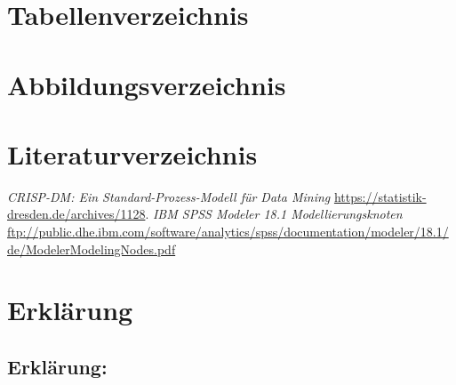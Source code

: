 \documentclass[a4paper,12pt]{article}
\begin{document}
\section{Tabellenverzeichnis}
\listoftables 


\newpage
\section{Abbildungsverzeichnis}
\listoffigures
{}
\newpage

\newpage
\section{Literaturverzeichnis}
\thispagestyle{plain}
\begin{thebibliography}{DiplRS}
 {\it CRISP-DM: Ein Standard-Prozess-Modell für Data Mining} \url{ https://statistik-dresden.de/archives/1128}.
 {\it IBM SPSS Modeler 18.1 Modellierungsknoten} 
\url{ftp://public.dhe.ibm.com/software/analytics/spss/documentation/modeler/18.1/de/ModelerModelingNodes.pdf}
\end{thebibliography}

\newpage
\section{Erklärung}
\begin{titlepage}
\section*{Erklärung:}

\vfill
\end{titlepage}
\end{document}
